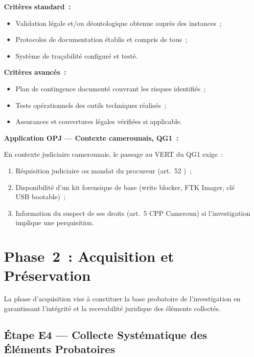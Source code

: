 \textbf{Critères standard~:}
\begin{itemize}
    \item Validation légale et/ou déontologique obtenue auprès des instances~;
    \item Protocoles de documentation établis et compris de tous~;
    \item Système de traçabilité configuré et testé.
\end{itemize}

\textbf{Critères avancés~:}
\begin{itemize}
    \item Plan de contingence documenté couvrant les risques identifiés~;
    \item Tests opérationnels des outils techniques réalisés~;
    \item Assurances et couvertures légales vérifiées si applicable.
\end{itemize}

\begin{boxPNC}
\textbf{Application OPJ --- Contexte camerounais, QG1~:}

En contexte judiciaire camerounais, le passage au VERT du QG1 exige~:
\begin{enumerate}
    \item Réquisition judiciaire ou mandat du procureur (art.~52 )~;
    \item Disponibilité d'un kit forensique de base (write blocker,
          FTK Imager, clé USB bootable)~;
    \item Information du suspect de ses droits (art.~5 CPP Cameroun)
          si l'investigation implique une perquisition.
\end{enumerate}
\end{boxPNC}

\section{Phase~2~: Acquisition et Préservation}
\label{sec:piu-phase2}

La phase d'acquisition vise à constituer la base probatoire de l'investigation
en garantissant l'intégrité et la recevabilité juridique des éléments collectés.

\subsection{Étape E4 --- Collecte Systématique des Éléments Probatoires}

